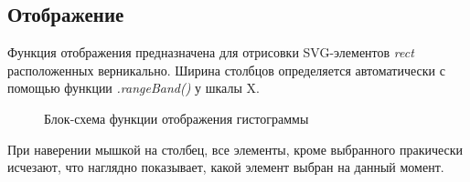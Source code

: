\documentclass[a4paper,14pt]{extreport}
\begin{document}
\subsection{Отображение}
\hspace{4ex}Функция отображения предназначена для отрисовки SVG-элементов \textit{rect} расположенных верникально. Ширина столбцов определяется автоматически с помощью функции \textit{.rangeBand()} у шкалы X.
\newpage
\begin{figure}[h]
\caption{Блок-схема функции отображения гистограммы}
\label{ris:image}
\end{figure}
\hspace{4ex}При наверении мышкой на столбец, все элементы, кроме выбранного пракически исчезают, что наглядно показывает, какой элемент выбран на данный момент.
\end{document}
